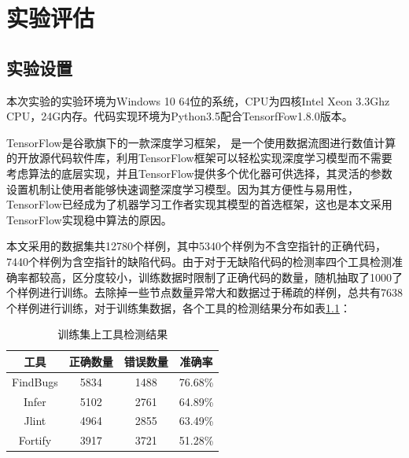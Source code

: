 \chapter{实验评估}
\section{实验设置}
本次实验的实验环境为Windows 10 64位的系统，CPU为四核Intel Xeon 3.3Ghz CPU，24G内存。代码实现环境为Python3.5配合TensorfFow1.8.0版本。

TensorFlow是谷歌旗下的一款深度学习框架， 是一个使用数据流图进行数值计算的开放源代码软件库，利用TensorFlow框架可以轻松实现深度学习模型而不需要考虑算法的底层实现，并且TensorFlow提供多个优化器可供选择，其灵活的参数设置机制让使用者能够快速调整深度学习模型。因为其方便性与易用性，TensorFlow已经成为了机器学习工作者实现其模型的首选框架，这也是本文采用TensorFlow实现稳中算法的原因。

本文采用的数据集共12780个样例，其中5340个样例为不含空指针的正确代码，7440个样例为含空指针的缺陷代码。由于对于无缺陷代码的检测率四个工具检测准确率都较高，区分度较小，训练数据时限制了正确代码的数量，随机抽取了1000了个样例进行训练。去除掉一些节点数量异常大和数据过于稀疏的样例，总共有7638个样例进行训练，对于训练集数据，各个工具的检测结果分布如表\ref{tt}：

\begin{table}[ht]
	\centering
	\caption{训练集上工具检测结果}
	\label{tt}
	\begin{tabular*}{0.9\textwidth}{@{\extracolsep{\fill}}cccc}
		\toprule
		工具	&正确数量&错误数量&准确率	 \\
		\midrule
		FindBugs&5834&1488&76.68\%\\
		Infer&5102&2761&64.89\%\\
		Jlint&4964&2855&63.49\%\\
		Fortify&3917&3721&51.28\%\\
		\bottomrule
	\end{tabular*}
\end{table}

